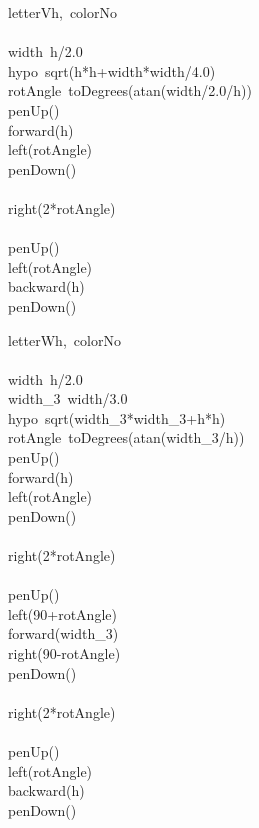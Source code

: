 \documentclass[a4paper,10pt]{article}
\begin{document}
\begin{pseudocode}{letterV}{h,\ colorNo }
\label{letterV}
\\
\\
  width\gets\ h/2.0\\
  hypo\gets\ sqrt(h*h+width*width/4.0)\\
  rotAngle\gets\ toDegrees(atan(width/2.0/h))\\
  penUp()\\
  forward(h)\\
  left(rotAngle)\\
  penDown()\\
  \\
  right(2*rotAngle)\\
  \\
  penUp()\\
  left(rotAngle)\\
  backward(h)\\
  penDown()\\
\ENDPROCEDURE
\end{pseudocode}


\begin{pseudocode}{letterW}{h,\ colorNo }
\label{letterW}
\\
\\
  width\gets\ h/2.0\\
  width\_3\gets\ width/3.0\\
  hypo\gets\ sqrt(width\_3*width\_3+h*h)\\
  rotAngle\gets\ toDegrees(atan(width\_3/h))\\
  penUp()\\
  forward(h)\\
  left(rotAngle)\\
  penDown()\\
  \\
  right(2*rotAngle)\\
  \\
  penUp()\\
  left(90+rotAngle)\\
  forward(width\_3)\\
  right(90-rotAngle)\\
  penDown()\\
  \\
  right(2*rotAngle)\\
  \\
  penUp()\\
  left(rotAngle)\\
  backward(h)\\
  penDown()\\
\ENDPROCEDURE
\end{pseudocode}
\end{document}
